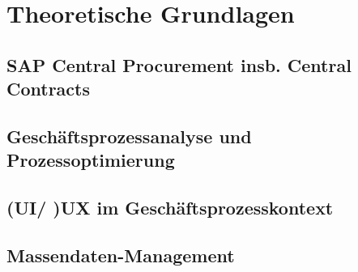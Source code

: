 \chapter{Theoretische Grundlagen}

\section{SAP Central Procurement insb. Central Contracts}

\section{Geschäftsprozessanalyse und Prozessoptimierung}

\section{(UI/ )UX im Geschäftsprozesskontext}

\section{Massendaten-Management}